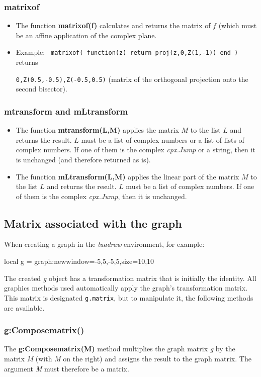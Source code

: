 \subsubsection{matrixof}
\begin{itemize}
    \item The function \textbf{matrixof(f)} calculates and returns the matrix of $f$ (which must be an affine application of the complex plane.
    \item Example: \texttt{ matrixof( function(z) return proj(z,{0,Z(1,-1)}) end )} returns \par
\texttt{{0,Z(0.5,-0.5),Z(-0.5,0.5)}} (matrix of the orthogonal projection onto the second bisector).
\end{itemize}

\subsubsection{mtransform and mLtransform}
\begin{itemize}
    \item The function \textbf{mtransform(L,M)} applies the matrix $M$ to the list $L$ and returns the result. $L$ must be a list of complex numbers or a list of lists of complex numbers. If one of them is the complex \emph{cpx.Jump} or a string, then it is unchanged (and therefore returned as is).
    \item The function \textbf{mLtransform(L,M)} applies the linear part of the matrix $M$ to the list $L$ and returns the result. $L$ must be a list of complex numbers. If one of them is the complex \emph{cpx.Jump}, then it is unchanged.
\end{itemize}

\subsection{Matrix associated with the graph}

When creating a graph in the \emph{luadraw} environment, for example:
\begin{Luacode}
local g = graph:new{window={-5,5,-5,5},size={10,10}}
\end{Luacode}
The created \emph{g} object has a transformation matrix that is initially the identity. All graphics methods used automatically apply the graph's transformation matrix. This matrix is ​​designated \texttt{g.matrix}, but to manipulate it, the following methods are available.

\subsubsection{g:Composematrix()}
The \textbf{g:Composematrix(M)} method multiplies the graph matrix \emph g by the matrix \emph{M} (with \emph{M} on the right) and assigns the result to the graph matrix. The argument \emph{M} must therefore be a matrix.

